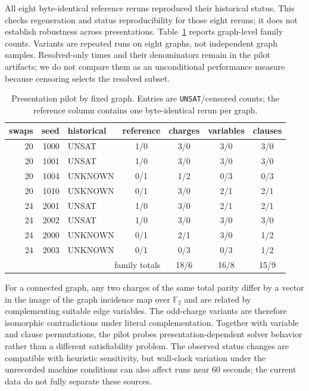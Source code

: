 \documentclass[11pt]{article}
\begin{document}
All eight byte-identical reference reruns reproduced their historical status. This checks regeneration and status reproducibility for those eight reruns; it does not establish robustness across presentations. Table~\ref{tab:presentation} reports graph-level family counts. Variants are repeated runs on eight graphs, not independent graph samples. Resolved-only times and their denominators remain in the pilot artifacts; we do not compare them as an unconditional performance measure because censoring selects the resolved subset.

\begin{table}[H]
\centering
\scriptsize
\caption{Presentation pilot by fixed graph. Entries are \texttt{UNSAT}/censored counts; the reference column contains one byte-identical rerun per graph.}
\label{tab:presentation}
\begin{tabular}{rrlcccc}
\toprule
swaps & seed & historical & reference & charges & variables & clauses\\
\midrule
20 & 1000 & UNSAT   & 1/0 & 3/0 & 3/0 & 3/0\\
20 & 1001 & UNSAT   & 1/0 & 3/0 & 3/0 & 3/0\\
20 & 1004 & UNKNOWN & 0/1 & 1/2 & 0/3 & 0/3\\
20 & 1010 & UNKNOWN & 0/1 & 3/0 & 2/1 & 2/1\\
24 & 2001 & UNSAT   & 1/0 & 3/0 & 2/1 & 2/1\\
24 & 2002 & UNSAT   & 1/0 & 3/0 & 3/0 & 3/0\\
24 & 2000 & UNKNOWN & 0/1 & 2/1 & 3/0 & 1/2\\
24 & 2003 & UNKNOWN & 0/1 & 0/3 & 0/3 & 1/2\\
\midrule
\multicolumn{4}{r}{family totals} & 18/6 & 16/8 & 15/9\\
\bottomrule
\end{tabular}
\end{table}

For a connected graph, any two charges of the same total parity differ by a vector in the image of the graph incidence map over $\mathbb{F}_2$ and are related by complementing suitable edge variables. The odd-charge variants are therefore isomorphic contradictions under literal complementation. Together with variable and clause permutations, the pilot probes presentation-dependent solver behavior rather than a different satisfiability problem. The observed status changes are compatible with heuristic sensitivity, but wall-clock variation under the unrecorded machine conditions can also affect runs near 60 seconds; the current data do not fully separate these sources.
\end{document}
